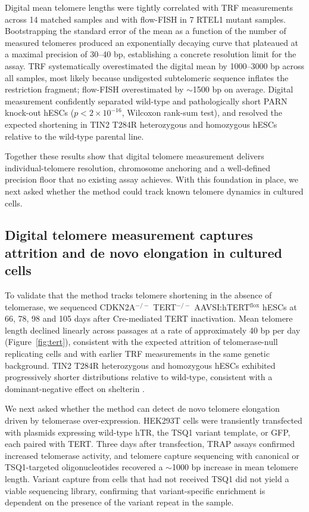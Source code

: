 \documentclass[11pt]{article}
\begin{document}
Digital mean telomere lengths were tightly correlated with TRF
measurements across 14 matched samples and with flow-FISH in 7 RTEL1
mutant samples. Bootstrapping the standard error of the mean as a
function of the number of measured telomeres produced an exponentially
decaying curve that plateaued at a maximal precision of 30--40 bp,
establishing a concrete resolution limit for the assay. TRF systematically
overestimated the digital mean by 1000--3000 bp across all samples,
most likely because undigested subtelomeric sequence inflates the
restriction fragment; flow-FISH overestimated by $\sim$1500 bp on
average. Digital measurement confidently separated wild-type and
pathologically short PARN knock-out hESCs ($p < 2 \times 10^{-16}$,
Wilcoxon rank-sum test), and resolved the expected shortening in TIN2
T284R heterozygous and homozygous hESCs relative to the wild-type
parental line.

Together these results show that digital telomere measurement delivers
individual-telomere resolution, chromosome anchoring and a well-defined
precision floor that no existing assay achieves. With this foundation in
place, we next asked whether the method could track known telomere
dynamics in cultured cells.

\subsection{Digital telomere measurement captures attrition and de novo elongation in cultured cells}

To validate that the method tracks telomere shortening in the absence
of telomerase, we sequenced CDKN2A$^{-/-}$ TERT$^{-/-}$
AAVSI:hTERT$^{\text{flox}}$ hESCs at 66, 78, 98 and 105 days after
Cre-mediated TERT inactivation. Mean telomere length declined linearly
across passages at a rate of approximately 40 bp per day
(Figure~\ref{fig:tert}), consistent with the expected attrition of
telomerase-null replicating cells and with earlier TRF measurements in
the same genetic background. TIN2 T284R heterozygous and homozygous
hESCs exhibited progressively shorter distributions relative to
wild-type, consistent with a dominant-negative effect on shelterin
\citep{palm2008howshelterin,hockemeyer2015control}.

We next asked whether the method can detect de novo telomere elongation
driven by telomerase over-expression. HEK293T cells were transiently
transfected with plasmids expressing wild-type hTR, the TSQ1 variant
template, or GFP, each paired with TERT. Three days after transfection,
TRAP assays confirmed increased telomerase activity, and telomere
capture sequencing with canonical or TSQ1-targeted oligonucleotides
recovered a $\sim$1000 bp increase in mean telomere length. Variant
capture from cells that had not received TSQ1 did not yield a viable
sequencing library, confirming that variant-specific enrichment is
dependent on the presence of the variant repeat in the sample.
\end{document}
